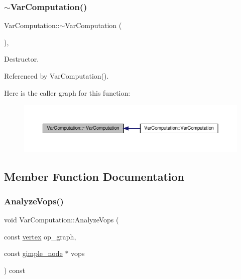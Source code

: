 \subsubsection{\texorpdfstring{$\sim$\+Var\+Computation()}{~VarComputation()}}
{\footnotesize\ttfamily Var\+Computation\+::$\sim$\+Var\+Computation (\begin{DoxyParamCaption}{ }\end{DoxyParamCaption})\hspace{0.3cm}{\ttfamily [override]}, {\ttfamily [default]}}



Destructor. 



Referenced by Var\+Computation().

Here is the caller graph for this function\+:
\nopagebreak
\begin{figure}[H]
\begin{center}
\leavevmode
\includegraphics[width=350pt]{dd/d82/classVarComputation_acd7be82192c76ea5af7116ed27063d64_icgraph}
\end{center}
\end{figure}


\subsection{Member Function Documentation}
\mbox{\label{classVarComputation_ad1023a1abf7c16ada56d21c0385a54be}} 
\subsubsection{\texorpdfstring{Analyze\+Vops()}{AnalyzeVops()}}
{\footnotesize\ttfamily void Var\+Computation\+::\+Analyze\+Vops (\begin{DoxyParamCaption}\item[{const \hyperlink{graph_8hpp_abefdcf0544e601805af44eca032cca14}{vertex}}]{op\+\_\+graph,  }\item[{const \hyperlink{structgimple__node}{gimple\+\_\+node} $\ast$}]{vops }\end{DoxyParamCaption}) const\hspace{0.3cm}{\ttfamily [private]}}



